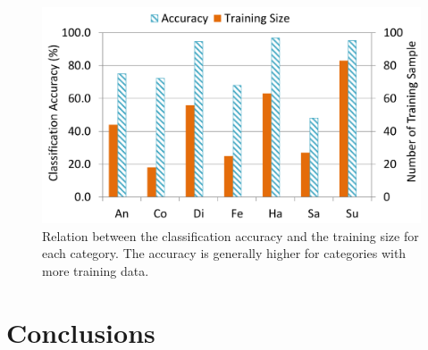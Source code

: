 \documentclass[journal]{IEEEtran}
\begin{document}
\begin{figure}[htbp]
	\centering
		\includegraphics[width=.8\columnwidth]{pics/fig_ck_size.png}
	\caption{Relation between the classification accuracy and the training size for each category. The accuracy is generally higher for categories with more training data.}
	\label{fig:fig_ck_size}
\end{figure}



\section{Conclusions\label{sec:conclude}}

\ifCLASSOPTIONcaptionsoff
  \newpage
\fi









\end{document}
